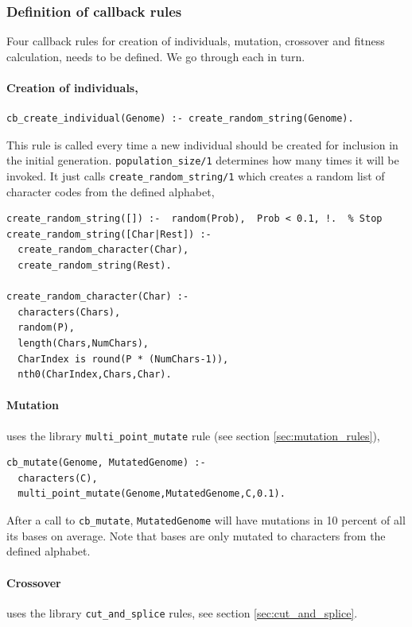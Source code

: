 \documentclass{article}
\begin{document}
\subsubsection{Definition of callback rules}

Four callback rules for creation of individuals, mutation, crossover and fitness calculation,  needs to be defined. We go through each in turn.

\paragraph{Creation of individuals,}

\begin{verbatim}
cb_create_individual(Genome) :- create_random_string(Genome).
\end{verbatim}
This rule is called every time a new individual should be created for inclusion in the initial generation. \verb|population_size/1| determines how many times it will be invoked.
It just calls \verb|create_random_string/1| which creates a random list of character codes from the defined alphabet,
\begin{verbatim}
create_random_string([]) :-  random(Prob),  Prob < 0.1, !.  % Stop
create_random_string([Char|Rest]) :-
  create_random_character(Char),
  create_random_string(Rest).

create_random_character(Char) :-
  characters(Chars),
  random(P),
  length(Chars,NumChars),
  CharIndex is round(P * (NumChars-1)),
  nth0(CharIndex,Chars,Char).
\end{verbatim}

\paragraph{Mutation} uses the library \verb|multi_point_mutate| rule (see section \ref{sec:mutation_rules}), 
\begin{verbatim}
cb_mutate(Genome, MutatedGenome) :-
  characters(C),
  multi_point_mutate(Genome,MutatedGenome,C,0.1).
\end{verbatim}

After a call to \verb|cb_mutate|, \verb|MutatedGenome| will have mutations in 10 percent of all its bases on average. Note that bases are only 
mutated to characters from the defined alphabet.

\paragraph{Crossover} uses the library \verb|cut_and_splice| rules, see section \ref{sec:cut_and_splice}.
\end{document}

